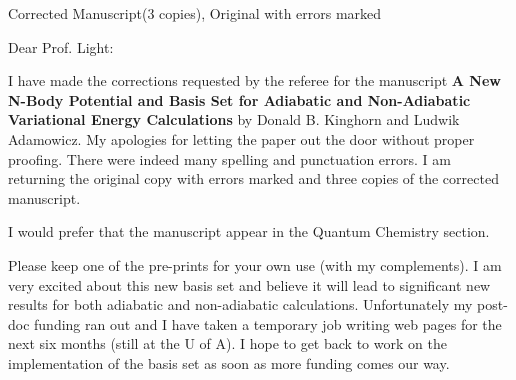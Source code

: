 \documentclass[12pt]{article}
\begin{document}
\begin{lettercc}
\end{lettercc}

\begin{letterencl}
Corrected Manuscript(3 copies), Original with errors marked
\end{letterencl}

\begin{letteropening}
Dear Prof. Light:
\end{letteropening}

I have made the corrections requested by the referee for the manuscript 
\textbf{A New N-Body Potential and Basis Set for Adiabatic and Non-Adiabatic
Variational Energy Calculations} by Donald B. Kinghorn and Ludwik Adamowicz.
My apologies for letting the paper out the door without proper proofing.
There were indeed many spelling and punctuation errors. I am returning the
original copy with errors marked and three copies of the corrected
manuscript.

I would prefer that the manuscript appear in the Quantum Chemistry section.

Please keep one of the pre-prints for your own use (with my complements). I
am very excited about this new basis set and believe it will lead to
significant new results for both adiabatic and non-adiabatic calculations.
Unfortunately my post-doc funding ran out and I have taken a temporary job
writing web pages for the next six months (still at the U of A). I hope to
get back to work on the implementation of the basis set as soon as more
funding comes our way.
\end{document}
